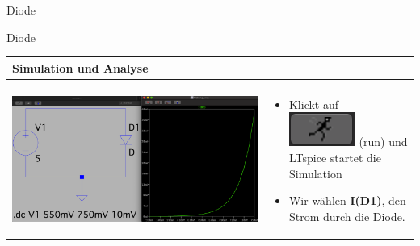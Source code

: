 \begin{frame}[t]{Diode}
\begin{spacing}{0.9}
\begin{tiny}
\begin{table}[h!]
      \end{table}

    \end{tiny} \end{spacing}

\end{frame}

\begin{frame}[t]{Diode}

  \begin{spacing}{0.9} \begin{tiny}
      \begin{table}[h!]
        \begin{tabular}{p{5cm} p{5cm}}
          \hline
          \textbf{Simulation und Analyse} & \\
          \hline                            \\
          \begin{minipage}{.5\textwidth}
            \includegraphics[width=\linewidth]{pictures/analysis_2.png}
          \end{minipage}
                                          &
          \begin{minipage}{.5\textwidth}
            \begin{itemize}
              \item Klickt auf \includegraphics[scale=0.3]{pictures/run.png} (run) und LTspice startet die Simulation
              \item Wir wählen \textbf{I(D1)}, den Strom durch die Diode.
            \end{itemize}
          \end{minipage}
          \\
        \end{tabular}
      \end{table}
    \end{tiny} \end{spacing}


\end{frame}
